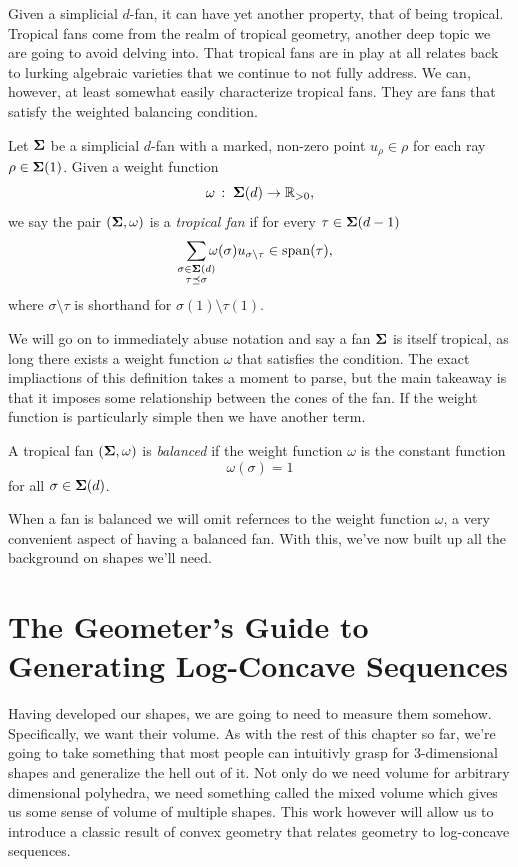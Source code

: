 \documentclass[12pt,oneside]{../../sfsuthesis}
\begin{document}
Given a simplicial \( d \)-fan, it can have yet another property, that of being tropical.
Tropical fans come from the realm of tropical geometry, another deep topic we are going to avoid delving into.
That tropical fans are in play at all relates back to lurking algebraic varieties that we continue to not fully address.
We can, however, at least somewhat easily characterize tropical fans.
They are fans that satisfy the weighted balancing condition.
\begin{definition}\th\label{def:tropical}
    Let \( \bm{\Sigma} \) be a simplicial \( d \)-fan with a marked, non-zero point \( u_\rho \in \rho \) for each ray \( \rho \in \bm{\Sigma}(1) \).
    Given a weight function
    \[
        \omega\,:\; \bm{\Sigma}(d) \to \mathbb{R}_{>0},
    \]
    we say the pair \( (\bm{\Sigma}, \omega) \) is a \emph{tropical fan} if for every \( \tau \in \bm{\Sigma}(d-1) \)
    \[
        \sum_{\mathclap{\substack{\sigma \in \bSigma(d) \\ \tau \preceq \sigma}}} \omega(\sigma) u_{\sigma \setminus \tau} \in \Span(\tau),
    \]
    where \( \sigma \setminus \tau \) is shorthand for \( \sigma(1) \setminus \tau(1) \).
\end{definition}
We will go on to immediately abuse notation and say a fan \( \bm{\Sigma} \) is itself tropical, as long there exists a weight function \( \omega \) that satisfies the condition.
The exact impliactions of this definition takes a moment to parse, but the main takeaway is that it imposes some relationship between the cones of the fan.
If the weight function is particularly simple then we have another term.
\begin{definition}\th\label{def:balanced}
    A tropical fan \( (\bm{\Sigma}, \omega) \) is \emph{balanced} if the weight function \( \omega \) is the constant function
    \[
        \omega(\sigma) = 1
    \]
    for all \( \sigma \in \bm{\Sigma}(d) \).
\end{definition}
When a fan is balanced we will omit refernces to the weight function \( \omega \), a very convenient aspect of having a balanced fan.
With this, we've now built up all the background on shapes we'll need.


\section{The Geometer's Guide to Generating Log-Concave Sequences}
Having developed our shapes, we are going to need to measure them somehow.
Specifically, we want their volume.
As with the rest of this chapter so far, we're going to take something that most people can intuitivly grasp for 3-dimensional shapes and generalize the hell out of it.
Not only do we need volume for arbitrary dimensional polyhedra, we need something called the mixed volume which gives us some sense of volume of multiple shapes.
This work however will allow us to introduce a classic result of convex geometry that relates geometry to log-concave sequences.
\end{document}
